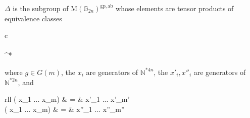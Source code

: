 \begin{lem} $\Delta$ is the subgroup of $\mathrm{M}(\mathbb{G}_{2n})^{\mathrm{gp, ab}}$ whose elements are tensor products of equivalence classes
\begin{eq*} \begin{array}{c}
			 \\
			\, \otimes \, \\
			^*
		\end{array}
\end{eq*} 
where $g \in G(m)$, the $x_i$ are generators of $\mathbb{N}^{\ast 4n}$, the $x'_i, x''_i$ are generators of $\mathbb{N}^{\ast 2n}$, and
\begin{eq*} \begin{array}{rll}
			\tilde{\delta}( x_1 \otimes ... \otimes x_m) & = & x'_1 \otimes ... \otimes x'_{m'} \\
			( x_1 \otimes ... \otimes x_m) & = & x''_1 \otimes ... \otimes x''_{m''}
		\end{array}
\end{eq*}
\end{lem}
